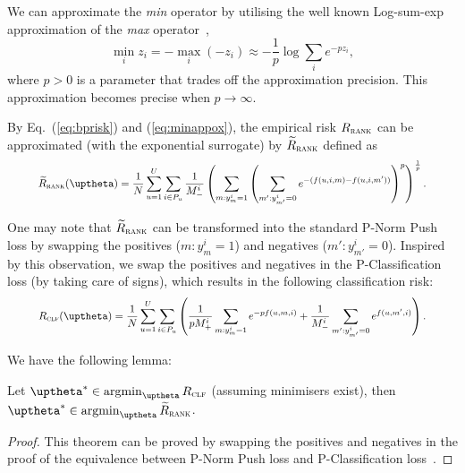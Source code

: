 We can approximate the \emph{min} operator by utilising the well known Log-sum-exp approximation 
of the \emph{max} operator~\cite[p. 72]{boyd2004convex},
\begin{equation}
\label{eq:minappox}
\min_i z_i = -\max_i (-z_i) \approx -\frac{1}{p} \log \sum_i e^{-p z_i},
\end{equation}
where $p > 0$ is a parameter that trades off the approximation precision.
This approximation becomes precise when $p \to \infty$.

By Eq.~(\ref{eq:bprisk}) and (\ref{eq:minappox}), the empirical risk $R_\textsc{rank}$ can be approximated
(with the exponential surrogate) by $\widetilde R_\textsc{rank}$ defined as
\begin{equation}
\label{eq:rankapprox}
\resizebox{.9\linewidth}{!}{$
\begin{aligned}
\widetilde R_\textsc{rank}(\uptheta)
= \frac{1}{N} \sum_{u=1}^U \sum_{i \in P_u} \frac{1}{M_-^i} \left( \sum_{m: y_m^i = 1} \left( \sum_{m': y_{m'}^i = 0} 
  e^{-(f(u, i, m) - f(u, i, m'))} \right)^p \right)^\frac{1}{p}.
\end{aligned}
$}
\end{equation}


One may note that $\widetilde R_\textsc{rank}$ can be transformed into the standard P-Norm Push loss by swapping the
positives ($m: y_m^i = 1$) and negatives ($m': y_{m'}^i = 0$). %
Inspired by this observation, we swap the positives and negatives in the P-Classification loss (by taking care of signs),
which results in the following classification risk:
\begin{equation}
\label{eq:clfrisk}
\resizebox{.9\linewidth}{!}{$\displaystyle
R_\textsc{clf}(\uptheta)
= \frac{1}{N} \sum_{u=1}^U \sum_{i \in P_u} \left(
  \frac{1}{p M_+^i} \sum_{m: y_m^i = 1} e^{-p f(u, m, i)}
  + \frac{1}{M_-^i} \sum_{m': y_{m'}^i = 0} e^{f(u, m', i)} \right).
$}
\end{equation}

We have the following lemma:
\begin{lemma}
\label{lm:rank2clf}
Let $\uptheta^* \in \argmin_{\uptheta} R_\textsc{clf}$ (assuming minimisers exist),
then $\uptheta^* \in \argmin_{\uptheta} \widetilde R_\textsc{rank}$.
\end{lemma}

\begin{proof}
This theorem can be proved by swapping the positives and negatives in the proof of 
the equivalence between P-Norm Push loss and P-Classification loss~\cite{ertekin2011equivalence}.
\end{proof}

